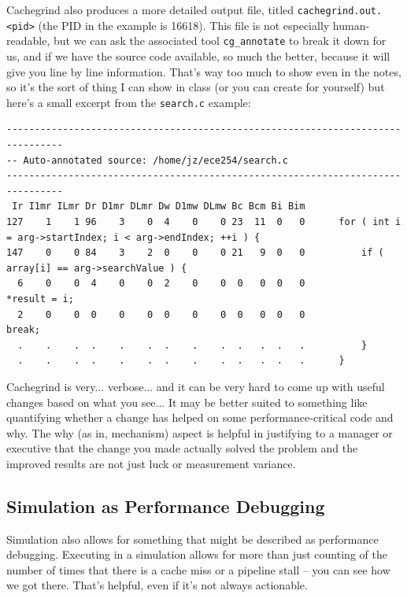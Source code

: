 Cachegrind also produces a more detailed output file, titled \texttt{cachegrind.out.<pid>} (the PID in the example is 16618). This file is not especially human-readable, but we can ask the associated tool \texttt{cg\_annotate} to break it down for us, and if we have the source code available, so much the better, because it will give you line by line information. That's way too much to show even in the notes, so it's the sort of thing I can show in class (or you can create for yourself) but here's a small excerpt from the \texttt{search.c} example:



{\scriptsize
\begin{lstlisting}
--------------------------------------------------------------------------------
-- Auto-annotated source: /home/jz/ece254/search.c
--------------------------------------------------------------------------------
 Ir I1mr ILmr Dr D1mr DLmr Dw D1mw DLmw Bc Bcm Bi Bim 
127    1    1 96    3    0  4    0    0 23  11  0   0      for ( int i = arg->startIndex; i < arg->endIndex; ++i ) {
147    0    0 84    3    2  0    0    0 21   9  0   0          if ( array[i] == arg->searchValue ) {
  6    0    0  4    0    0  2    0    0  0   0  0   0              *result = i;
  2    0    0  0    0    0  0    0    0  0   0  0   0              break;
  .    .    .  .    .    .  .    .    .  .   .  .   .          }
  .    .    .  .    .    .  .    .    .  .   .  .   .      }
\end{lstlisting}
}

Cachegrind is very... verbose... and it can be very hard to come up with useful changes based on what you see... It may be better suited to something like quantifying whether a change has helped on some performance-critical code and why. The why (as in, mechanism) aspect is helpful in justifying to a manager or executive that the change you made actually solved the problem and the improved results are not just luck or measurement variance.

\subsection*{Simulation as Performance Debugging}
Simulation also allows for something that might be described as performance debugging. Executing in a simulation allows for more than just counting of the number of times that there is a cache miss or a pipeline stall -- you can see how we got there. That's helpful, even if it's not always actionable.

